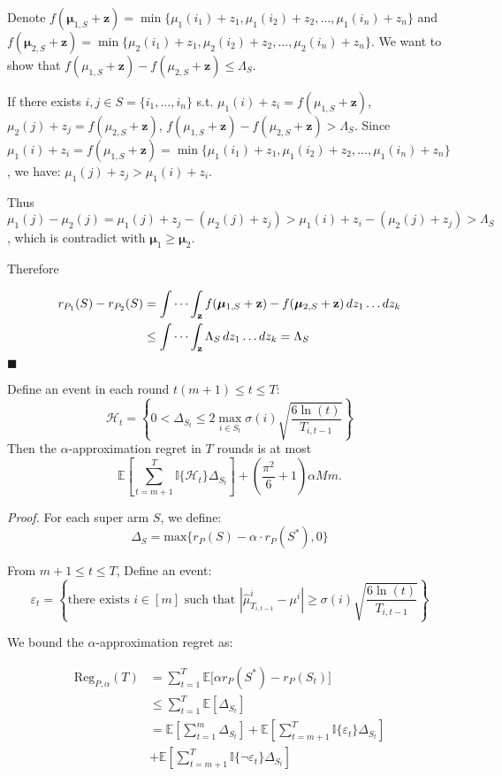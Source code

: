 \documentclass[opre,sglanonrev]{informs4}
\begin{document}
Denote $f(\boldsymbol{\mu}_{1,S}+\mathbf{z}) = \min \{\mu_1(i_1)+z_1,\mu_1(i_2)+z_2, \dots ,\mu_1(i_n)+z_n\}$ and $f(\boldsymbol{\mu}_{2,S}+\mathbf{z}) = \min \{\mu_2(i_1)+z_1,\mu_2(i_2)+z_2, \dots ,\mu_2(i_n)+z_n\}$. We want to show that $f(\mu_{1,S}+\mathbf{z})-f(\mu_{2,S}+\mathbf{z})\leq \Lambda_S$.

If there exists $i,j\in S=\{i_1,...,i_n\}$ s.t. $\mu_1(i)+z_i = f(\mu_{1,S}+\mathbf{z})$, $\mu_2(j)+z_j = f(\mu_{2,S}+\mathbf{z})$, $f(\mu_{1,S}+\mathbf{z})-f(\mu_{2,S}+\mathbf{z})>\Lambda_S$. Since $\mu_1(i)+z_i = f(\mu_{1,S}+\mathbf{z}) = \min \{\mu_1(i_1)+z_1,\mu_1(i_2)+z_2, \dots ,\mu_1(i_n)+z_n\}$, we have: $\mu_1(j)+z_j> \mu_1(i)+z_i$.

Thus $\mu_1(j)-\mu_2(j) = \mu_1(j)+z_j-(\mu_2(j)+z_j)>\mu_1(i)+z_i-(\mu_2(j)+z_j)>\Lambda_S$, which is contradict with $\boldsymbol{\mu}_1 \geq \boldsymbol{\mu}_2$.

Therefore

$$
\begin{aligned}
r_{P_1}(S)-r_{P_2}(S) &= \idotsint_\mathbf{z} f(\boldsymbol{\mu}_{1,S}+\mathbf{z})-f(\boldsymbol{\mu}_{2,S}+\mathbf{z}) \,dz_1 \dots dz_k\\
&\leq \idotsint_\mathbf{z} \Lambda_S \,dz_1 \dots dz_k = \Lambda_S 
\end{aligned}
$$
\hfill $\blacksquare$

\begin{lemma}
Define an event in each round $t(m+1)\leq t \leq T$:
$$
	\mathcal{H}_t = \left\{0<\Delta_{S_t}\leq 2\mathop{\max}\limits_{i\in S_t}\sigma(i)\sqrt{\frac{6\ln(t)}{T_{i,t-1}}}\right\}
$$
Then the $\alpha$-approximation regret in $T$ rounds is at most
$$
	\mathbb{E}[\sum_{t=m+1}^{T}\mathbb{I}\{\mathcal{H}_t\}\Delta_{S_t}] + (\frac{\pi^2}{6}+1)\alpha M m.
$$
\end{lemma}
\textit{Proof.} For each super arm $S$, we define:
$$
\Delta_S = \text{max}\{r_P(S) - \alpha \cdot r_P(S^*), 0 \}
$$

From $m+1\leq t \leq T$, Define an event:
$$
\varepsilon_t = \left\{\text{there exists } i \in [m] \text{ such that } |\hat{\mu}_{T_{i,t-1}}^i-\mu^i| \geq \sigma(i)\sqrt{\frac{6\ln(t)}{T_{i,t-1}}}\right\}
$$

We bound the $\alpha$-approximation regret as:

\begin{equation}
	\begin{aligned}
		  \text{Reg}_{P,\alpha}(T) &= \sum_{t=1}^{T}\mathbb{E}\big[\alpha r_P(S^*) - r_P(S_t)\big]\\
		  &\leq \sum_{t=1}^{T}\mathbb{E}[\Delta_{S_t}]\\
		  &=\mathbb{E}[\sum_{t=1}^{m}\Delta_{S_t}]+\mathbb{E}[\sum_{t=m+1}^{T}\mathbb{I}\{\varepsilon_t\}\Delta_{S_t}]\\
		  &+\mathbb{E}[\sum_{t=m+1}^{T}\mathbb{I}\{\lnot \varepsilon_t\}\Delta_{S_t}]
	\end{aligned}
\end{equation}
\end{document}
